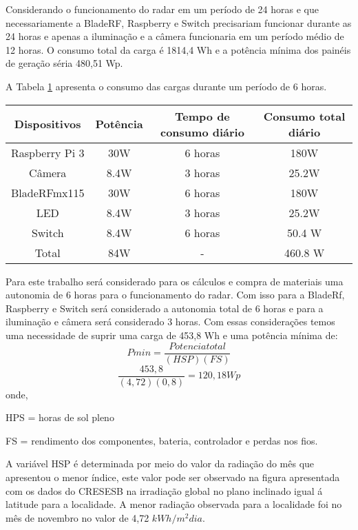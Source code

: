Considerando o funcionamento do radar em um período de 24 horas e que necessariamente a BladeRF, Raspberry e Switch precisariam funcionar durante as 24 horas e apenas a iluminação e a câmera funcionaria em um período médio de 12 horas. O consumo total da carga é 1814,4 Wh e a potência mínima dos painéis de geração séria 480,51 Wp.

A Tabela \ref{tab6} apresenta o consumo das cargas durante um período de 6 horas.

\begin{table}[H]
\begin{tabular}{|c|c|c|c|} \label{tab6}


Dispositivos             & Potência         & Tempo de consumo diário & Consumo total diário \\ \hline
Raspberry Pi 3  & 30W  & 6 horas          & 180W    \\ \hline
Câmera & 8.4W  &   3 horas        & 25.2W \\ \hline
BladeRFmx115 & 30W  & 6 horas         & 180W \\ \hline
LED       & 8.4W &  3 horas & 25.2W    \\ \hline
Switch       & 8.4W &  6 horas & 50.4 W    \\ \hline
Total & 84W & - & 460.8 W \\ \hline

\end{tabular}
\end{table}
\FloatBarrier

Para este trabalho será considerado para os cálculos e compra de materiais uma autonomia de 6 horas para o funcionamento do radar. Com isso para a BladeRf, Raspberry e Switch será considerado a autonomia total de 6 horas e para a iluminação e câmera será considerado 3 horas. Com essas considerações temos uma necessidade de suprir uma carga de 453,8 Wh e uma potência mínima de:
\begin{equation}
    Pmin = \frac{Potencia total}{(HSP)(FS)} 
\end{equation}
\begin{equation}
    \frac{453,8}{(4,72)(0,8)} = 120,18 Wp
\end{equation}
onde, 

HPS = horas de sol pleno

FS = rendimento dos componentes, bateria, controlador e perdas nos fios.

A variável HSP é determinada por meio do valor da radiação do mês que apresentou o menor índice, este valor pode ser observado na figura apresentada com os dados do CRESESB na irradiação global no plano inclinado igual á latitude para a localidade. A menor radiação observada para a localidade foi no mês de novembro no valor de 4,72 $kWh/m^2dia$. 
 
